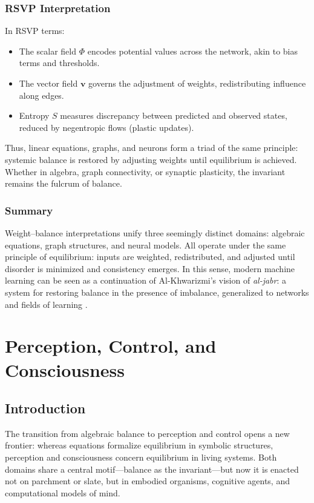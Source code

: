 \documentclass[a4paper,11pt,openany]{book}
\begin{document}
\section{RSVP Interpretation}
In RSVP terms:
\begin{itemize}
  \item The scalar field $\Phi$ encodes potential values across the network, akin to bias 
  terms and thresholds.
  \item The vector field $\mathbf{v}$ governs the adjustment of weights, redistributing 
  influence along edges.
  \item Entropy $S$ measures discrepancy between predicted and observed states, reduced by 
  negentropic flows (plastic updates).
\end{itemize}
Thus, linear equations, graphs, and neurons form a triad of the same principle: systemic 
balance is restored by adjusting weights until equilibrium is achieved. Whether in algebra, 
graph connectivity, or synaptic plasticity, the invariant remains the fulcrum of balance.

\section{Summary}
Weight–balance interpretations unify three seemingly distinct domains: algebraic equations, 
graph structures, and neural models. All operate under the same principle of equilibrium: 
inputs are weighted, redistributed, and adjusted until disorder is minimized and consistency 
emerges. In this sense, modern machine learning can be seen as a continuation of 
Al-Khwarizmi’s vision of \emph{al-jabr}: a system for restoring balance in the presence of 
imbalance, generalized to networks and fields of learning \citep{sipser2013tcs}.


\part{Perception, Control, and Consciousness}

\chapter*{Introduction}

The transition from algebraic balance to perception and control opens a new frontier: 
whereas equations formalize equilibrium in symbolic structures, perception and consciousness 
concern equilibrium in living systems. Both domains share a central motif—balance as the 
invariant—but now it is enacted not on parchment or slate, but in embodied organisms, 
cognitive agents, and computational models of mind.
\end{document}
